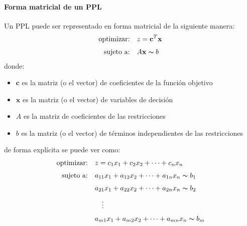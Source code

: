 \vspace{3mm}

\paragraph{Forma matricial de un PPL}

Un PPL puede ser representado en forma matricial de la siguiente manera:
\begin{align*}
  \text{optimizar:} \quad   &z = \mathbf{c}^T\mathbf{x} \\[3pt]
  \text{sujeto a:} \quad    &A\mathbf{x} \thicksim  b \\
\end{align*}
donde:
\begin{itemize}
  \item \(\mathbf{c}\) es la matriz (o el vector) de coeficientes de la función objetivo
  \item \(\mathbf{x}\) es la matriz (o el vector) de variables de decisión
  \item \(A\) es la matriz de coeficientes de las restricciones
  \item \(b\) es la matriz (o el vector) de términos independientes de las restricciones
\end{itemize}
de forma explícita se puede ver como:
\begin{align*}
  \text{optimizar:} \quad   &z = c_{1}x_{1} + c_{2}x_{2} + \cdots + c_{n}x_{n} \\[3pt]
  \text{sujeto a:} \quad    &a_{11}x_{1} + a_{12}x_{2} + \cdots + a_{1n}x_{n} \thicksim b_{1} \\[3pt]
                            &a_{21}x_{1} + a_{22}x_{2} + \cdots + a_{2n}x_{n} \thicksim b_{2} \\[3pt]
                            &\quad \vdots \\[3pt]
                            &a_{m1}x_{1} + a_{m2}x_{2} + \cdots + a_{mn}x_{n} \thicksim b_{m} \\[3pt]
\end{align*}
